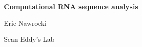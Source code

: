 \documentclass[landscape]{slides}
\begin{document}
\begin{slide}
\begin{center}
\large{\textbf{Computational RNA sequence analysis}}

\normalsize

Eric Nawrocki

Sean Eddy's Lab


\medskip

\medskip

\small



\end{center}
\end{slide}
\begin{slide}
\end{slide}
\end{document}
